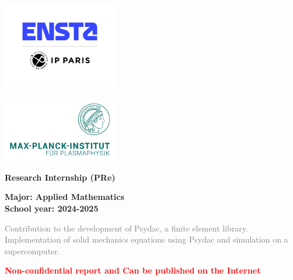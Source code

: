 \documentclass[a4paper,12pt,twoside]{report}
\author{Arasu Candassamy}
\begin{document}
\thispagestyle{empty}

\begin{minipage}{0.6\textwidth}
    \includegraphics[width=5cm]{figures/logoENSTA.jpg} 
\end{minipage}
\hfill
\begin{minipage}{0.6\textwidth}
    \includegraphics[width=5cm]{figures/logoMPI.png}
\end{minipage}

\vspace{2cm}

\begin{center}
    {\LARGE \textbf{Research Internship (PRe)}}
    
    \vspace{0.5cm}
    \textbf{Major: Applied Mathematics} \\
    \textbf{School year: 2024-2025}
    
    \vspace{2cm}
    
    {\Huge \textcolor{gray}{Contribution to the development of Psydac, a finite element library.}} \\
	{\Large \textcolor{gray}{Implementation of solid mechanics equations using Psydac and simulation on a supercomputer.}} \\
    
    \vspace{1.5cm}
        
    \begin{framed}
        \centering
        \textcolor{red}{\textbf{Non-confidential report and Can be published on the Internet}} 
    \end{framed}
\end{center}
\end{document}
